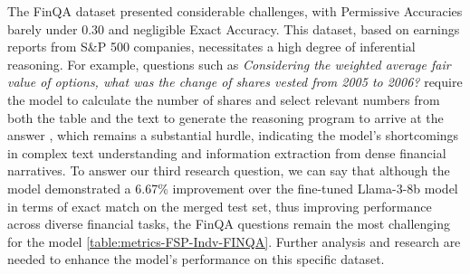 \documentclass[logo,msc]{infthesis}           %
\begin{document}

The FinQA dataset presented considerable challenges, with Permissive Accuracies barely under 0.30 and negligible Exact Accuracy. This dataset, based on earnings reports from S&P 500 companies, necessitates a high degree of inferential reasoning. For example, questions such as \emph{Considering the weighted average fair value of options, what was the change of shares vested from 2005 to 2006?} require the model to calculate the number of shares and select relevant numbers from both the table and the text to generate the reasoning program to arrive at the answer \cite{chen2021finqa}, which remains a substantial hurdle, indicating the model's shortcomings in complex text understanding and information extraction from dense financial narratives. To answer our third research question, we can say that although the model demonstrated a 6.67\% improvement over the fine-tuned Llama-3-8b model in terms of exact match on the merged test set, thus improving performance across diverse financial tasks, the FinQA questions remain the most challenging for the model \ref{table:metrics-FSP-Indv-FINQA}. Further analysis and research are needed to enhance the model's performance on this specific dataset.
\end{document}
